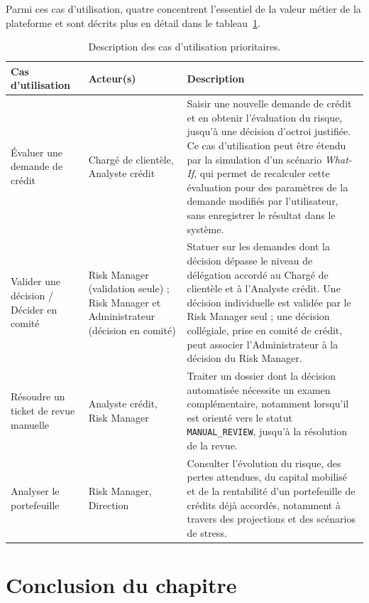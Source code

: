 Parmi ces cas d'utilisation, quatre concentrent l'essentiel de la valeur métier de la plateforme et sont décrits plus en détail dans le tableau~\ref{tab:cas-utilisation-prioritaires}.

\begin{table}[htbp]
    \centering
    \footnotesize
    \caption{Description des cas d'utilisation prioritaires.}
    \label{tab:cas-utilisation-prioritaires}
    \begin{tabular}{p{3cm}p{3cm}p{8cm}}
        \toprule
        \textbf{Cas d'utilisation} & \textbf{Acteur(s)} & \textbf{Description} \\
        \midrule
        Évaluer une demande de crédit &
        Chargé de clientèle, Analyste crédit &
        Saisir une nouvelle demande de crédit et en obtenir l'évaluation du risque, jusqu'à une décision d'octroi justifiée. Ce cas d'utilisation peut être étendu par la simulation d'un scénario \emph{What-If}, qui permet de recalculer cette évaluation pour des paramètres de la demande modifiés par l'utilisateur, sans enregistrer le résultat dans le système. \\
        \addlinespace
        Valider une décision / Décider en comité &
        Risk Manager (validation seule) ; Risk Manager et Administrateur (décision en comité) &
Statuer sur les demandes dont la décision dépasse le niveau de délégation accordé au Chargé de clientèle et à l'Analyste crédit. Une décision individuelle est validée par le Risk Manager seul ; une décision collégiale, prise en comité de crédit, peut associer l'Administrateur à la décision du Risk Manager. \\
        \addlinespace
        Résoudre un ticket de revue manuelle &
        Analyste crédit, Risk Manager &
        Traiter un dossier dont la décision automatisée nécessite un examen complémentaire, notamment lorsqu'il est orienté vers le statut \texttt{MANUAL\_REVIEW}, jusqu'à la résolution de la revue. \\
        \addlinespace
        Analyser le portefeuille &
        Risk Manager, Direction &
        Consulter l'évolution du risque, des pertes attendues, du capital mobilisé et de la rentabilité d'un portefeuille de crédits déjà accordés, notamment à travers des projections et des scénarios de stress. \\
        \bottomrule
    \end{tabular}
\end{table}

\section*{Conclusion du chapitre}

